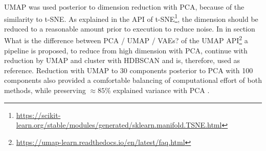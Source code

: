 


        
        
        
        

\gls{UMAP} was used posterior to dimension reduction with \gls{PCA}, because of the similarity to \gls{t-SNE}. As explained in the API of \gls{t-SNE}\footnote{\url{https://scikit-learn.org/stable/modules/generated/sklearn.manifold.TSNE.html}}, the dimension should be reduced to a reasonable amount prior to execution to reduce noise. In in section \glqq What is the difference between PCA / UMAP / VAEs?\grqq{} of the \gls{UMAP} API\footnote{\url{https://umap-learn.readthedocs.io/en/latest/faq.html}} a pipeline is proposed, to reduce from high dimension with \gls{PCA}, continue with reduction by \gls{UMAP} and cluster with \gls{HDBSCAN} and is, therefore, used as reference. Reduction with \gls{UMAP} to 30 components posterior to \gls{PCA} with 100 components also provided a comfortable balancing of computational effort of both methods, while preserving $\approx 85\%$ explained variance with \gls{PCA} \autocite{mcinnes_umap_2020}. 

